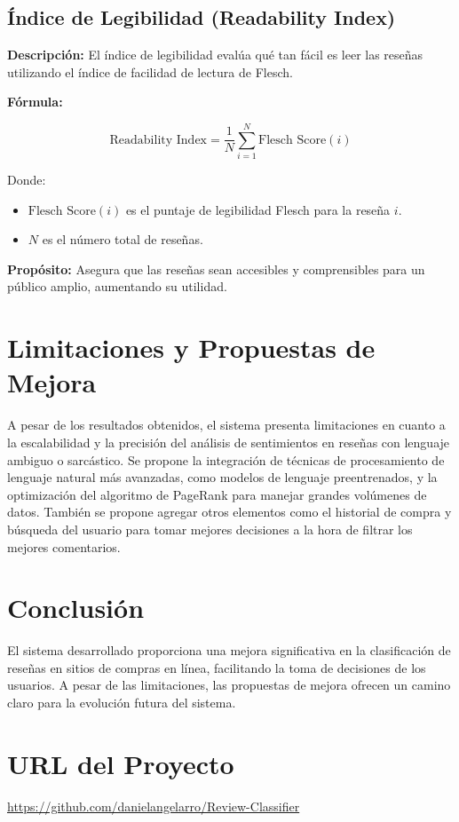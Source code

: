 \documentclass{llncs}
\begin{document}
    \subsection{Índice de Legibilidad (Readability Index)}

    \textbf{Descripción:}  
    El índice de legibilidad evalúa qué tan fácil es leer las reseñas utilizando el índice de facilidad de lectura de Flesch. 

    \textbf{Fórmula:}

    \[
    \text{Readability Index} = \frac{1}{N} \sum_{i=1}^{N} \text{Flesch Score}(i)
    \]

    Donde:
    \begin{itemize}
        \item \( \text{Flesch Score}(i) \) es el puntaje de legibilidad Flesch para la reseña \( i \).
        \item \( N \) es el número total de reseñas.
    \end{itemize}

    \textbf{Propósito:}  
    Asegura que las reseñas sean accesibles y comprensibles para un público amplio, aumentando su utilidad.

    
    \section{Limitaciones y Propuestas de Mejora}
    A pesar de los resultados obtenidos, el sistema presenta limitaciones en cuanto a la escalabilidad y la precisión del análisis de sentimientos en reseñas con lenguaje ambiguo o sarcástico. Se propone la integración de técnicas de procesamiento de lenguaje natural más avanzadas, como modelos de lenguaje preentrenados, y la optimización del algoritmo de PageRank para manejar grandes volúmenes de datos. También se propone agregar otros elementos como el historial de compra y búsqueda del usuario para tomar mejores decisiones a la hora de filtrar los mejores comentarios.
    
    \section{Conclusión}
    El sistema desarrollado proporciona una mejora significativa en la clasificación de reseñas en sitios de compras en línea, facilitando la toma de decisiones de los usuarios. A pesar de las limitaciones, las propuestas de mejora ofrecen un camino claro para la evolución futura del sistema.
    
    \section{URL del Proyecto}
    \url{https://github.com/danielangelarro/Review-Classifier}

    
    
	
\end{document}
